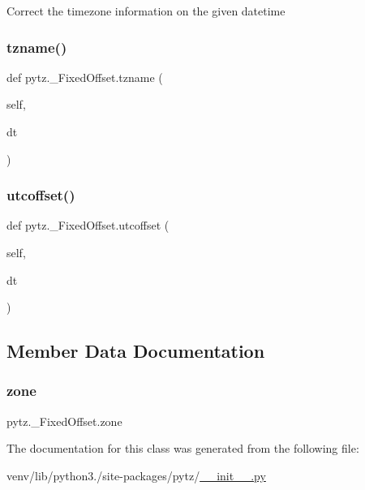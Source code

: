 \begin{DoxyVerb}Correct the timezone information on the given datetime\end{DoxyVerb}
 \mbox{\label{classpytz_1_1__FixedOffset_a713c51656ca1c4baf17a1b82840a0393}} 
\subsubsection{\texorpdfstring{tzname()}{tzname()}}
{\footnotesize\ttfamily def pytz.\+\_\+\+Fixed\+Offset.\+tzname (\begin{DoxyParamCaption}\item[{}]{self,  }\item[{}]{dt }\end{DoxyParamCaption})}

\mbox{\label{classpytz_1_1__FixedOffset_a9eb73f79e89d8186e9b215f9ec8a55b1}} 
\subsubsection{\texorpdfstring{utcoffset()}{utcoffset()}}
{\footnotesize\ttfamily def pytz.\+\_\+\+Fixed\+Offset.\+utcoffset (\begin{DoxyParamCaption}\item[{}]{self,  }\item[{}]{dt }\end{DoxyParamCaption})}



\subsection{Member Data Documentation}
\mbox{\label{classpytz_1_1__FixedOffset_af8ac9e8a61a6ec6a4372d82eb802e141}} 
\subsubsection{\texorpdfstring{zone}{zone}}
{\footnotesize\ttfamily pytz.\+\_\+\+Fixed\+Offset.\+zone\hspace{0.3cm}{\ttfamily [static]}}



The documentation for this class was generated from the following file\+:\begin{DoxyCompactItemize}
\item 
venv/lib/python3./site-\/packages/pytz/\hyperlink{venv_2lib_2python3_89_2site-packages_2pytz_2____init_____8py}{\+\_\+\+\_\+init\+\_\+\+\_\+.\+py}\end{DoxyCompactItemize}

